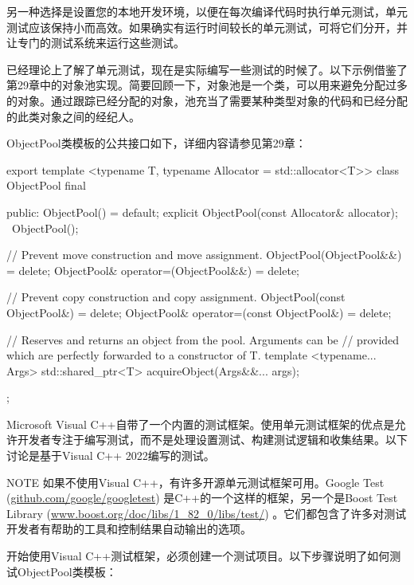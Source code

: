 另一种选择是设置您的本地开发环境，以便在每次编译代码时执行单元测试，单元测试应该保持小而高效。如果确实有运行时间较长的单元测试，可将它们分开，并让专门的测试系统来运行这些测试。


已经理论上了解了单元测试，现在是实际编写一些测试的时候了。以下示例借鉴了第29章中的对象池实现。简要回顾一下，对象池是一个类，可以用来避免分配过多的对象。通过跟踪已经分配的对象，池充当了需要某种类型对象的代码和已经分配的此类对象之间的经纪人。

ObjectPool类模板的公共接口如下，详细内容请参见第29章：

\begin{cpp}
export
template <typename T, typename Allocator = std::allocator<T>>
class ObjectPool final
{
    public:
        ObjectPool() = default;
        explicit ObjectPool(const Allocator& allocator);
        ~ObjectPool();

        // Prevent move construction and move assignment.
        ObjectPool(ObjectPool&&) = delete;
        ObjectPool& operator=(ObjectPool&&) = delete;

        // Prevent copy construction and copy assignment.
        ObjectPool(const ObjectPool&) = delete;
        ObjectPool& operator=(const ObjectPool&) = delete;

        // Reserves and returns an object from the pool. Arguments can be
        // provided which are perfectly forwarded to a constructor of T.
        template <typename... Args>
        std::shared_ptr<T> acquireObject(Args&&... args);
};
\end{cpp}


Microsoft Visual C++自带了一个内置的测试框架。使用单元测试框架的优点是允许开发者专注于编写测试，而不是处理设置测试、构建测试逻辑和收集结果。以下讨论是基于Visual C++ 2022编写的测试。

\begin{myNotic}{NOTE}
如果不使用Visual C++，有许多开源单元测试框架可用。Google Test (\url{github.com/google/googletest}) 是C++的一个这样的框架，另一个是Boost Test Library (\url{www.boost.org/doc/libs/1_82_0/libs/test/}) 。它们都包含了许多对测试开发者有帮助的工具和控制结果自动输出的选项。
\end{myNotic}

开始使用Visual C++测试框架，必须创建一个测试项目。以下步骤说明了如何测试ObjectPool类模板：

